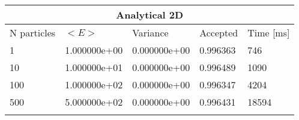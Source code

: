 \begin{tabular}{|l|l|l|l|l|}
\hline 
\multicolumn{5}{|c|}{Analytical 2D}\\ 
\hline 
N particles & $<E>$ & Variance & Accepted & Time [ms]\\ 
 \hline 
1 & 1.000000e+00 & 0.000000e+00 & 0.996363 & 746 \\ \hline 
10 & 1.000000e+01 & 0.000000e+00 & 0.996489 & 1090 \\ \hline 
100 & 1.000000e+02 & 0.000000e+00 & 0.996347 & 4204 \\ \hline 
500 & 5.000000e+02 & 0.000000e+00 & 0.996431 & 18594 \\ \hline 
\label{i:a2} 
\end{tabular}